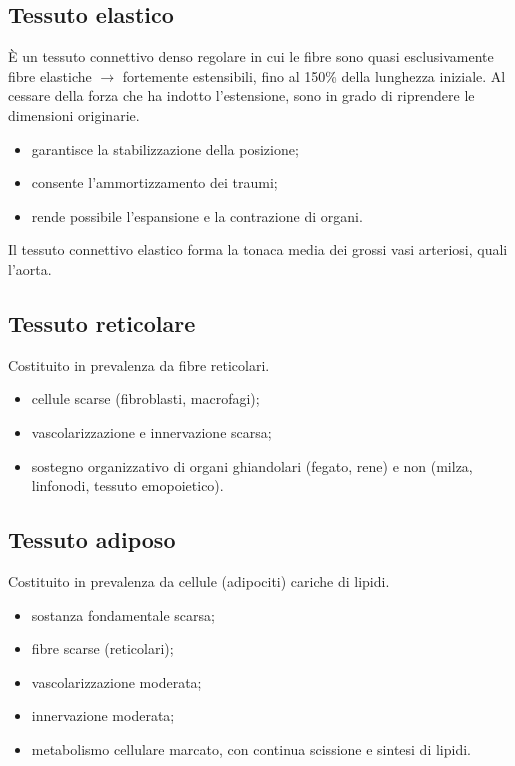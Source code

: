 \subsection{Tessuto elastico}

È un tessuto connettivo denso regolare in cui le fibre sono quasi esclusivamente fibre elastiche $\rightarrow$ fortemente estensibili, fino al 150\% della lunghezza iniziale. Al cessare della forza che ha indotto l'estensione, sono in grado di riprendere le dimensioni originarie.

\begin{itemize}
  \item garantisce la stabilizzazione della posizione;
  \item consente l'ammortizzamento dei traumi;
  \item rende possibile l'espansione e la contrazione di organi.
\end{itemize}

Il tessuto connettivo elastico forma la tonaca media dei grossi vasi arteriosi, quali l'aorta.

\subsection{Tessuto reticolare}

Costituito in prevalenza da fibre reticolari.
\begin{itemize}
  \item cellule scarse (fibroblasti, macrofagi);
  \item vascolarizzazione e innervazione scarsa;
  \item sostegno organizzativo di organi ghiandolari (fegato, rene) e non (milza, linfonodi, tessuto emopoietico).
\end{itemize}

\subsection{Tessuto adiposo}

Costituito in prevalenza da cellule (adipociti) cariche di lipidi.
\begin{itemize}
  \item sostanza fondamentale scarsa;
  \item fibre scarse (reticolari);
  \item vascolarizzazione moderata;
  \item innervazione moderata;
  \item metabolismo cellulare marcato, con continua scissione e sintesi di lipidi.
\end{itemize}

